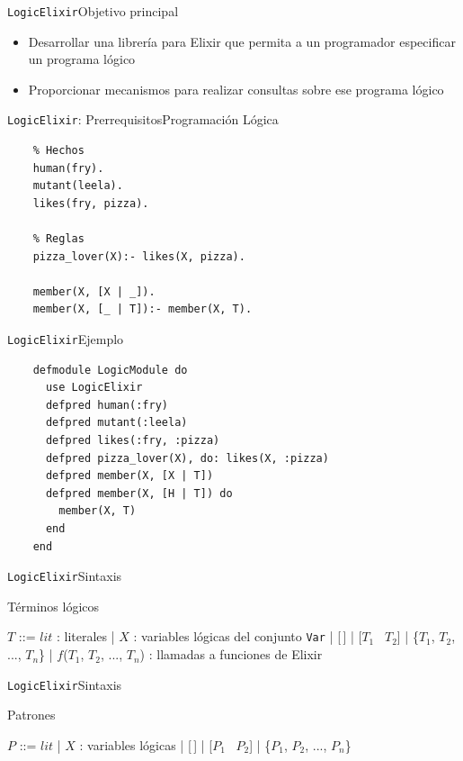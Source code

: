 \documentclass[14pt,aspectratio=169]{beamer}
\begin{document}
\begin{frame}{\texttt{LogicElixir}}{Objetivo principal}
  \begin{itemize}
    \item Desarrollar una librería para Elixir que permita
    a un programador especificar un programa lógico
    \item Proporcionar mecanismos para realizar consultas sobre
    ese programa lógico
  \end{itemize}
\end{frame}

\begin{frame}[fragile]{\texttt{LogicElixir}: Prerrequisitos}{Programación Lógica}
  \begin{verbatim}
    % Hechos
    human(fry).
    mutant(leela).
    likes(fry, pizza).

    % Reglas
    pizza_lover(X):- likes(X, pizza).

    member(X, [X | _]).
    member(X, [_ | T]):- member(X, T).

  \end{verbatim}
\end{frame}

\begin{frame}[fragile]{\texttt{LogicElixir}}{Ejemplo}
  \small \begin{verbatim}
    defmodule LogicModule do
      use LogicElixir
      defpred human(:fry)
      defpred mutant(:leela)
      defpred likes(:fry, :pizza)
      defpred pizza_lover(X), do: likes(X, :pizza)
      defpred member(X, [X | T])
      defpred member(X, [H | T]) do
        member(X, T)
      end
    end
  \end{verbatim}
\end{frame}

\begin{frame}{\texttt{LogicElixir}}{Sintaxis}
  \footnotesize \begin{block}{Términos lógicos}
    \begin{bnfgrammar}
      $T$ ::= $lit$ : literales
        | $X$ : variables lógicas del conjunto \texttt{Var}
        | [\,]
        | [$T_1$ \textbar\ $T_2$]
        | \{$T_1$, $T_2$, ..., $T_n$\}
        | $f$($T_1$, $T_2$, ..., $T_n$) : llamadas a funciones de Elixir
    \end{bnfgrammar}
  \end{block}
\end{frame}

\begin{frame}{\texttt{LogicElixir}}{Sintaxis}
  \begin{block}{Patrones}
    \begin{bnfgrammar}
      $P$ ::= $lit$
      | $X$ : variables lógicas
      | [\,]
      | [$P_1$ \textbar\ $P_2$]
      | \{$P_1$, $P_2$, ..., $P_n$\}
    \end{bnfgrammar}
  \end{block}
\end{frame}
\end{document}
